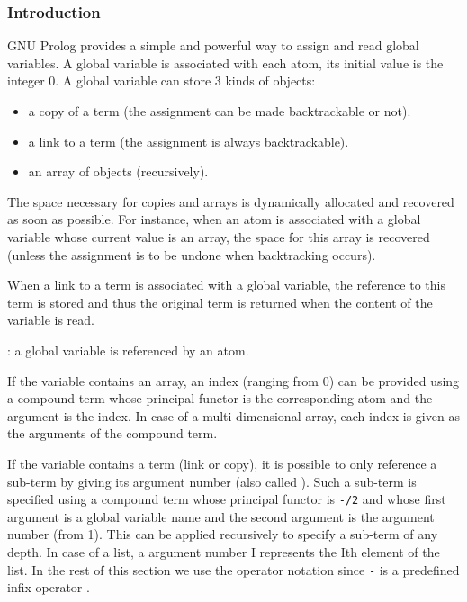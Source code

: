 \subsubsection{Introduction}
\label{Global-variables}

GNU Prolog provides a simple and powerful way to assign and read global
variables. A global variable is associated with each atom, its initial value is
the integer 0. A global variable can store 3 kinds of objects:

\begin{itemize}

\item a copy of a term (the assignment can be made backtrackable or not).

\item a link to a term (the assignment is always backtrackable).

\item an array of objects (recursively).

\end{itemize}

The space necessary for copies and arrays is dynamically allocated and
recovered as soon as possible. For instance, when an atom is associated with a
global variable whose current value is an array, the space for this array is
recovered (unless the assignment is to be undone when backtracking occurs).

When a link to a term is associated with a global variable, the reference to
this term is stored and thus the original term is returned when the content
of the variable is read.

: a global variable is referenced 
by an atom. 

If the variable contains an array, an index (ranging from 0) can be provided
using a compound term whose principal functor is the corresponding atom and
the argument is the index. In case of a multi-dimensional array, each index
is given as the arguments of the compound term.

If the variable contains a term (link or copy), it is possible to only
reference a sub-term by giving its argument number (also called ). Such a sub-term is specified using a compound term whose
principal functor is \texttt{-/2} and whose first argument is a global
variable name and the second argument is the argument number (from 1). This
can be applied recursively to specify a sub-term of any depth. In case of a
list, a argument number I represents the Ith element of the list.  In the
rest of this section we use the operator notation since \texttt{-} is a
predefined infix operator .

